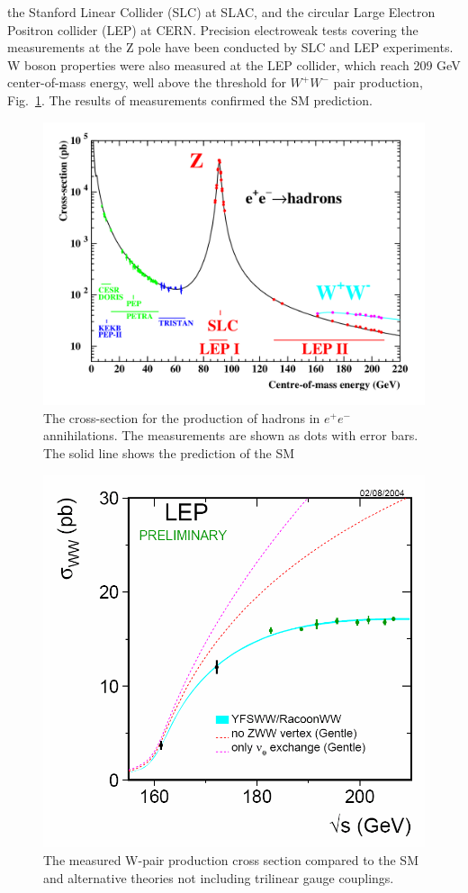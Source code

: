 the Stanford Linear Collider (SLC) at SLAC,  and the circular Large Electron
Positron collider (LEP) at CERN. Precision electroweak tests covering the measurements at the Z pole  have been conducted by SLC and LEP experiments.
W boson properties were also measured at the LEP collider, which reach 209 GeV center-of-mass energy, well above the threshold for $W^+W^-$ pair production,  Fig.~\ref{alt}. The results of measurements confirmed the SM prediction. 
\begin{figure}
\centering
\includegraphics[scale= 0.5]{../Cap1/alt_Z}
\caption{The cross-section for the production of hadrons in $e^+e^-$ annihilations. The measurements are shown as dots with error bars. The solid line shows the prediction of the SM}
\end{figure}
\begin{figure}
\centering
\includegraphics[scale= 0.3]{../Cap1/alt_W}
\caption{ The measured W-pair production cross section compared to the SM and alternative
theories not including trilinear gauge couplings.}
\label{alt}
\end{figure}
